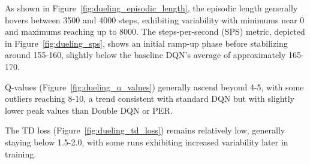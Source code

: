 As shown in Figure~\ref{fig:dueling_episodic_length}, the episodic length generally hovers between 3500 and 4000 steps, exhibiting variability with minimums near 0 and maximums reaching up to 8000. The steps-per-second (SPS) metric, depicted in Figure~\ref{fig:dueling_sps}, shows an initial ramp-up phase before stabilizing around 155-160, slightly below the baseline DQN's average of approximately 165-170.

Q-values (Figure~\ref{fig:dueling_q_values}) generally ascend beyond 4-5, with some outliers reaching 8-10, a trend consistent with standard DQN but with slightly lower peak values than Double DQN or PER. 

The TD loss (Figure~\ref{fig:dueling_td_loss}) remains relatively low, generally staying below 1.5-2.0, with some runs exhibiting increased variability later in training. 

